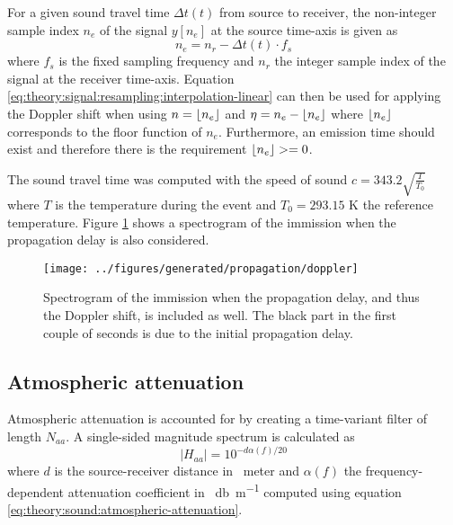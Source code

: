 For a given sound travel time $\Delta t(t)$ from source to receiver, the non-integer sample index
$n_{e}$ of the signal $y[n_e]$ at the source time-axis is given as
\begin{equation}
 n_{e} = n_r - \Delta t (t) \cdot f_s
\end{equation}
where $f_s$ is the fixed sampling frequency and $n_r$ the integer sample index
of the signal at the receiver time-axis. Equation
\eqref{eq:theory:signal:resampling:interpolation-linear} can then be used for
applying the Doppler shift when using $n=\lfloor n_e\rfloor$ and $\eta = n_e - \lfloor n_e\rfloor$
where $\lfloor n_e\rfloor$ corresponds to the floor function of $n_e$.
Furthermore, an emission time should exist and therefore there is the
requirement $\lfloor n_e\rfloor >= 0$.

The sound travel time was computed with the speed of sound $c =
343.2 \sqrt{ \frac{T}{T_0} }$ where $T$ is the temperature during the event and
$T_0 = 293.15$ K the reference temperature.
Figure \ref{fig:implementation:propagation:doppler} shows a spectrogram of the
immission when the propagation delay is also considered.

\begin{figure}[H]
  \centering
  \texttt{[image: ../figures/generated/propagation/doppler]}
  \caption{Spectrogram of the immission when the propagation delay, and thus the Doppler shift, is included as well. The black part in the first couple of seconds is due to the initial propagation delay.}
  \label{fig:implementation:propagation:doppler}
\end{figure}

\newpage
\subsection{Atmospheric attenuation} %
Atmospheric attenuation is accounted for by creating a time-variant filter of length $N_{aa}$.
A single-sided magnitude spectrum is calculated as
\begin{equation}
 \left| H_{aa} \right| = 10^{- d \alpha(f) / 20}
\end{equation}
where $d$ is the source-receiver distance in \SI{}{meter} and $\alpha(f)$ the
frequency-dependent attenuation coefficient in \SI{}{\decibel\per\meter} computed using
equation \eqref{eq:theory:sound:atmospheric-attenuation}.

